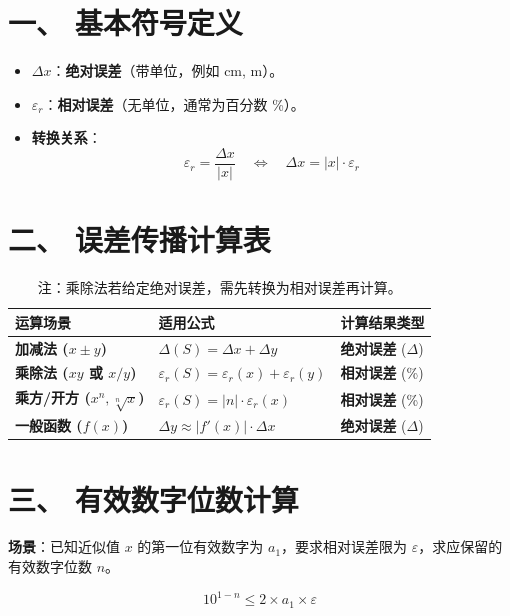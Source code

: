 \documentclass[12pt, a4paper]{article}
\begin{document}
\section*{一、 基本符号定义}
\begin{itemize}
    \item $\Delta x$：\textbf{绝对误差}（带单位，例如 cm, m）。
    \item $\varepsilon_r$：\textbf{相对误差}（无单位，通常为百分数 \%）。
    \item \textbf{转换关系}：
    \[
    \varepsilon_r = \frac{\Delta x}{|x|} \quad \Longleftrightarrow \quad \Delta x = |x| \cdot \varepsilon_r
    \]
\end{itemize}

\section*{二、 误差传播计算表}
\renewcommand{\arraystretch}{1.5} %
\begin{table}[h!]
    \centering
    \begin{tabular}{@{} >{\bfseries}l l l @{}}
        \toprule
        \textbf{运算场景} & \textbf{适用公式} & \textbf{计算结果类型} \\
        \midrule
        加减法 ($x \pm y$) & $\Delta(S) = \Delta x + \Delta y$ & \textbf{绝对误差} ($\Delta$) \\
        乘除法 ($xy$ 或 $x/y$) & $\varepsilon_r(S) = \varepsilon_r(x) + \varepsilon_r(y)$ & \textbf{相对误差} (\%) \\
        乘方/开方 ($x^n, \sqrt[n]{x}$) & $\varepsilon_r(S) = |n| \cdot \varepsilon_r(x)$ & \textbf{相对误差} (\%) \\
        一般函数 ($f(x)$) & $\Delta y \approx |f'(x)| \cdot \Delta x$ & \textbf{绝对误差} ($\Delta$) \\
        \bottomrule
    \end{tabular}
    \caption*{注：乘除法若给定绝对误差，需先转换为相对误差再计算。}
\end{table}

\section*{三、 有效数字位数计算}
\textbf{场景}：已知近似值 $x$ 的第一位有效数字为 $a_1$，要求相对误差限为 $\varepsilon$，求应保留的有效数字位数 $n$。

\begin{equation*}
    \boxed{10^{1-n} \leqslant 2 \times a_1 \times \varepsilon}
\end{equation*}
\end{document}

